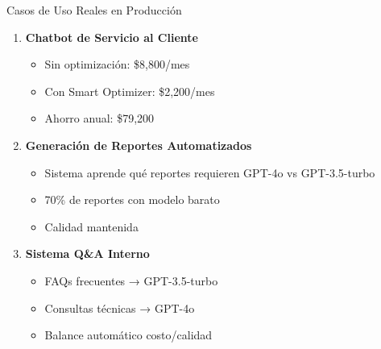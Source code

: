 \documentclass[aspectratio=169,11pt]{beamer}
\begin{document}
\begin{frame}{Casos de Uso Reales en Producción}
\begin{enumerate}
    \item \textbf{Chatbot de Servicio al Cliente}
    \begin{itemize}
        \item Sin optimización: \$8,800/mes
        \item Con Smart Optimizer: \$2,200/mes
        \item \textcolor{kavakgreen}{Ahorro anual: \$79,200}
    \end{itemize}
    
    \vspace{0.3cm}
    
    \item \textbf{Generación de Reportes Automatizados}
    \begin{itemize}
        \item Sistema aprende qué reportes requieren GPT-4o vs GPT-3.5-turbo
        \item 70\% de reportes con modelo barato
        \item Calidad mantenida
    \end{itemize}
    
    \vspace{0.3cm}
    
    \item \textbf{Sistema Q\&A Interno}
    \begin{itemize}
        \item FAQs frecuentes → GPT-3.5-turbo
        \item Consultas técnicas → GPT-4o
        \item Balance automático costo/calidad
    \end{itemize}
\end{enumerate}
\end{frame}
\end{document}
